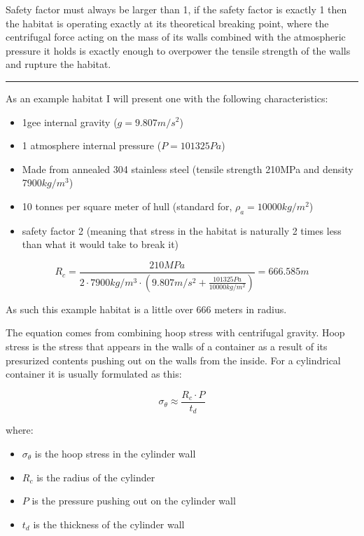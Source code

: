 \documentclass[a4paper]{article}
\begin{document}
	Safety factor must always be larger than 1, if the safety factor is exactly 1 then the habitat is operating exactly at its theoretical breaking point, where the centrifugal force acting on the mass of its walls combined with the atmospheric pressure it holds is exactly enough to overpower the tensile strength of the walls and rupture the habitat.
	
	\bigskip
	
	\noindent \rule{\linewidth}{1pt}
	
	\bigskip
	
	As an example habitat I will present one with the following characteristics:
	
	\begin{itemize}
		\item 1gee internal gravity ($g = 9.807m/s^2$)
		
		\item 1 atmosphere internal pressure ($P = 101325 Pa$)
		
		\item Made from annealed 304 stainless steel (tensile strength 210MPa and density 7900$kg/m^3$)
		
		\item 10 tonnes per square meter of hull (standard for, $\rho_a = 10 000kg/m^2$)
		
		\item safety factor 2 (meaning that stress in the habitat is naturally 2 times less than what it would take to break it)
	\end{itemize}
	
	$$ R_c = \frac{210MPa}{2 \cdot 7900kg/m^3 \cdot (9.807m/s^2 + \frac{101325 Pa}{10 000kg/m^2})} = 666.585m$$
	
	As such this example habitat is a little over 666 meters in radius.
	
	\pagebreak
	
	The equation comes from combining hoop stress with centrifugal gravity. Hoop stress is the stress that appears in the walls of a container as a result of its presurized contents pushing out on the walls from the inside. For a cylindrical container it is usually formulated as this:
	
	$$ \sigma_\theta \approx \frac{R_c \cdot P}{t_d} $$
	
	where:
	
	\begin{itemize}
		\item $\sigma_\theta$ is the hoop stress in the cylinder wall
		
		\item $R_c$ is the radius of the cylinder
		
		\item $P$ is the pressure pushing out on the cylinder wall
		
		\item $t_d$ is the thickness of the cylinder wall
	\end{itemize}
	
\end{document}
